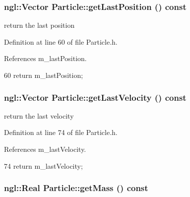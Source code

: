 \hypertarget{class_particle_aaac2b15b45cd70fddfb6736290458e76}{
\subsubsection[{getLastPosition}]{\setlength{\rightskip}{0pt plus 5cm}ngl::Vector Particle::getLastPosition () const}}
\label{class_particle_aaac2b15b45cd70fddfb6736290458e76}


return the last position 



Definition at line 60 of file Particle.h.



References m\_\-lastPosition.




\begin{DoxyCode}
60 { return m_lastPosition; }
\end{DoxyCode}


\hypertarget{class_particle_ab12a2455cfdb31df6dd9e67eaffee833}{
\subsubsection[{getLastVelocity}]{\setlength{\rightskip}{0pt plus 5cm}ngl::Vector Particle::getLastVelocity () const}}
\label{class_particle_ab12a2455cfdb31df6dd9e67eaffee833}


return the last velocity 



Definition at line 74 of file Particle.h.



References m\_\-lastVelocity.




\begin{DoxyCode}
74 { return m_lastVelocity; }
\end{DoxyCode}


\hypertarget{class_particle_a51c37948e3b1e36f812be660c306c93b}{
\subsubsection[{getMass}]{\setlength{\rightskip}{0pt plus 5cm}ngl::Real Particle::getMass () const}}
\label{class_particle_a51c37948e3b1e36f812be660c306c93b}


